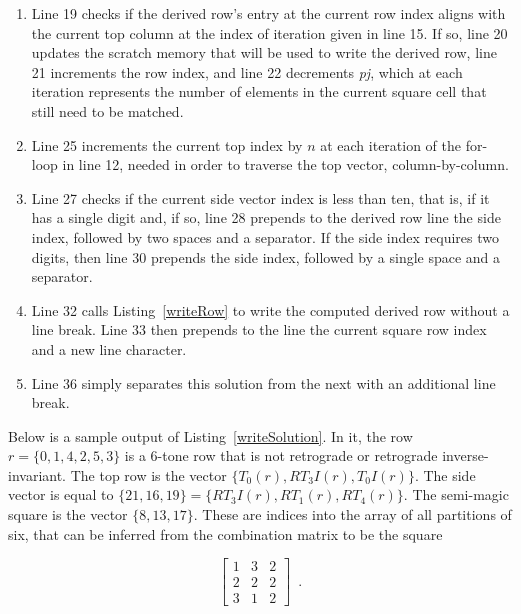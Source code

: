 \begin{enumerate}
\addtocounter{enumi}{3}
\item Line 19 checks if the derived row's entry at the current row index aligns with the current top column at the index of iteration given in line 15. If so, line 20 updates the scratch memory that will be used to write the derived row, line 21 increments the row index, and line 22 decrements \emph{pj}, which at each iteration represents the number of elements in the current square cell that still need to be matched.
\addtocounter{enumi}{5}
\item Line 25 increments the current top index by $n$ at each iteration of the for-loop in line 12, needed in order to traverse the top vector, column-by-column.
\addtocounter{enumi}{1}
\item Line 27 checks if the current side vector index is less than ten, that is, if it has a single digit and, if so, line 28 prepends to the derived row line the side index, followed by two spaces and a separator. If the side index requires two digits, then line 30 prepends the side index, followed by a single space and a separator.
\addtocounter{enumi}{4}
\item Line 32 calls Listing~\ref{writeRow} to write the computed derived row without a line break. Line 33 then prepends to the line the current square row index and a new line character.
\addtocounter{enumi}{3}
\item Line 36 simply separates this solution from the next with an additional line break.
\end{enumerate}

\begin{example}
	Below is a sample output of Listing~\ref{writeSolution}. In it, the row $r = \{0, 1, 4, 2, 5, 3\}$ is a 6-tone row that is not retrograde or retrograde inverse-invariant. The top row is the vector $\{T_0(r), RT_3I(r), T_0I(r)\}$. The side vector is equal to $\{21, 16, 19\} = \{RT_3I(r), RT_1(r), RT_4(r)\}$. The semi-magic square is the vector $\{8, 13, 17\}$. These are indices into the array of all partitions of six, that can be inferred from the combination matrix to be the square
	
	\begin{equation}
        \left[
        \begin{array}{c|c|c}
            1 & 3 & 2 \\
            \hline
            2 & 2 & 2 \\
            \hline
            3 & 1 & 2
        \end{array}
        \right] \enspace.
    \end{equation}
\end{example}

